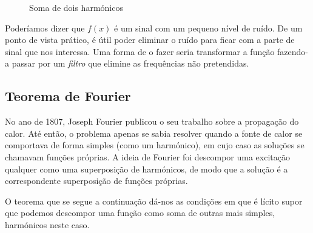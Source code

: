\begin{figure}[h]
\begin{figurebox}
    \vspace{-5pt}
    \centering
         \scalebox{0.4}{ }
    \vspace{-10pt}
    \caption{Soma de dois harmónicos}
    \label{fig:FuncionEjemplo}
\end{figurebox}
\end{figure}

Poderíamos dizer que $f(x)$ é um sinal com um pequeno nível de ruído. De um ponto de vista prático, é útil poder eliminar o ruído para ficar com a parte de sinal que nos interessa. Uma forma de o fazer seria transformar a função fazendo-a passar por um \textit{filtro} que elimine as frequências não pretendidas.


\subsection{Teorema de Fourier}
No ano de 1807, Joseph Fourier publicou o seu trabalho sobre a propagação do calor. Até então, o problema apenas se sabia resolver quando a fonte de calor se comportava de forma simples (como um harmónico), em cujo caso as soluções se chamavam funções próprias. A ideia de Fourier foi descompor uma excitação qualquer como uma superposição de harmónicos, de modo que a solução é a correspondente superposição de funções próprias.

O teorema que se segue a continuação dá-nos as condições em que é lícito supor que podemos descompor uma função como soma de outras mais simples, harmónicos neste caso.

